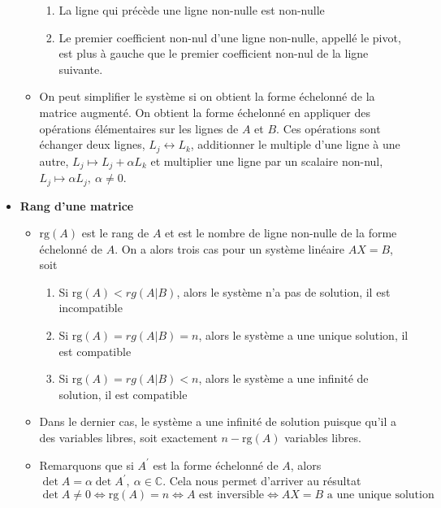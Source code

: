 \begin{itemize}
\begin{itemize}
\begin{enumerate}
                        \item La ligne qui précède une ligne non-nulle est non-nulle
                        \item Le premier coefficient non-nul d'une ligne non-nulle, appellé le pivot, est plus à
                              gauche que le premier coefficient non-nul de la ligne suivante.
                    \end{enumerate}
              \item[] On peut simplifier le système si on obtient la forme échelonné de la matrice augmenté. On obtient la forme échelonné
                    en appliquer des opérations élémentaires sur les lignes de $A$ et $B$. Ces opérations sont
                    échanger deux lignes, $L_j \leftrightarrow L_k$, additionner le multiple d'une ligne à une autre, 
                    $L_j \mapsto L_j + \alpha L_k$ et multiplier une ligne par un scalaire non-nul, $L_j \mapsto \alpha L_j, \ \alpha \neq 0$.
          \end{itemize}
    \item[] \textbf{Rang d'une matrice} \begin{itemize}
              \item[] $\text{rg}(A)$ est le rang de $A$ et est le nombre de ligne non-nulle de la forme échelonné
                    de $A$. On a alors trois cas pour un système linéaire $AX = B$, soit \begin{enumerate}
                        \item Si $\text{rg}(A) < rg(A|B)$, alors le système n'a pas de solution, il est incompatible
                        \item Si $\text{rg}(A) = rg(A|B) = n$, alors le système a une unique solution, il est compatible
                        \item Si $\text{rg}(A) = rg(A|B) < n$, alors le système a une infinité de solution, il est compatible
                    \end{enumerate}
              \item[] Dans le dernier cas, le système a une infinité de solution puisque qu'il a des variables libres,
                    soit exactement $n - \text{rg}(A)$ variables libres.
              \item[] Remarquons que si $A^\prime$ est la forme échelonné de $A$, alors $\det A = \alpha \det A^\prime, \ \alpha \in \mathbb{C}$.
                    Cela nous permet d'arriver au résultat \begin{equation*}
                        \det A \neq 0 \iff \text{rg}(A) = n \iff A \text{ est inversible} \iff AX=B \text{ a une unique solution}

\end{equation*}
\end{itemize}
\end{itemize}
